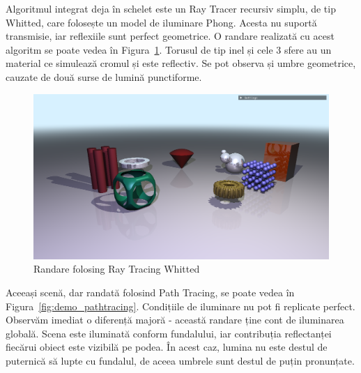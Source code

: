 \documentclass[12pt,a4paper]{report}
\numberwithin{equation}{section} %
\begin{document}
Algoritmul integrat deja în schelet este un Ray Tracer recursiv simplu, de tip Whitted,
care folosește un model de iluminare Phong. Acesta nu suportă transmisie, iar
reflexiile sunt perfect geometrice. O randare realizată cu acest algoritm se poate
vedea în Figura~\ref{fig:demo_whitted}. Torusul de tip inel și cele 3 sfere
au un material ce simulează cromul și este reflectiv. Se pot observa și umbre
geometrice, cauzate de două surse de lumină punctiforme.
\begin{figure}[ht]
	\centering
	\includegraphics[width=\textwidth]{pics/demo_whitted.png}
	\caption{Randare folosing Ray Tracing Whitted}
	\label{fig:demo_whitted}
\end{figure}
Aceeași scenă, dar randată folosind Path Tracing, se poate vedea în Figura~\ref{fig:demo_pathtracing}.
Condițiile de iluminare nu pot fi replicate perfect. Observăm imediat o diferență
majoră - această randare ține cont de iluminarea globală. Scena este iluminată
conform fundalului, iar contribuția reflectanței fiecărui obiect este vizibilă
pe podea. În acest caz, lumina nu este destul de puternică să lupte cu fundalul,
de aceea umbrele sunt destul de puțin pronunțate.
\end{document}
